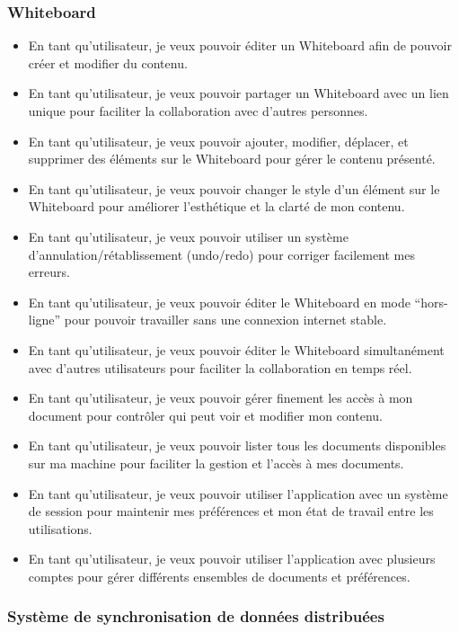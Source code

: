 \subsubsection*{Whiteboard}

\begin{itemize}
    \item En tant qu'utilisateur, je veux pouvoir éditer un Whiteboard afin de pouvoir créer et modifier du contenu.
    \item En tant qu'utilisateur, je veux pouvoir partager un Whiteboard avec un lien unique pour faciliter la collaboration avec d'autres personnes.
    \item En tant qu'utilisateur, je veux pouvoir ajouter, modifier, déplacer, et supprimer des éléments sur le Whiteboard pour gérer le contenu présenté.
    \item En tant qu'utilisateur, je veux pouvoir changer le style d'un élément sur le Whiteboard pour améliorer l'esthétique et la clarté de mon contenu.
    \item En tant qu'utilisateur, je veux pouvoir utiliser un système d'annulation/rétablissement (undo/redo) pour corriger facilement mes erreurs.
    \item En tant qu'utilisateur, je veux pouvoir éditer le Whiteboard en mode “hors-ligne” pour pouvoir travailler sans une connexion internet stable.
    \item En tant qu'utilisateur, je veux pouvoir éditer le Whiteboard simultanément avec d'autres utilisateurs pour faciliter la collaboration en temps réel.
    \item En tant qu'utilisateur, je veux pouvoir gérer finement les accès à mon document pour contrôler qui peut voir et modifier mon contenu.
    \item En tant qu'utilisateur, je veux pouvoir lister tous les documents disponibles sur ma machine pour faciliter la gestion et l'accès à mes documents.
    \item En tant qu'utilisateur, je veux pouvoir utiliser l'application avec un système de session pour maintenir mes préférences et mon état de travail entre les utilisations.
    \item En tant qu'utilisateur, je veux pouvoir utiliser l'application avec plusieurs comptes pour gérer différents ensembles de documents et préférences.
\end{itemize}

\subsubsection*{Système de synchronisation de données distribuées}

